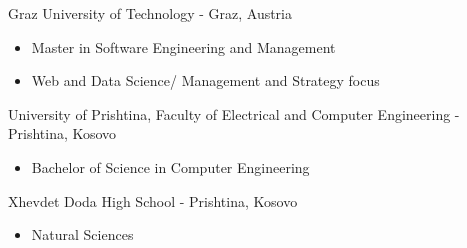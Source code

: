 %
%
%

\begin{scholarship}
  \emptySeparator

					{Graz University of Technology - Graz, Austria
					\begin{itemize}
                        \item Master in Software Engineering and Management
                        \item Web and Data Science/ Management and Strategy focus        
                      \end{itemize}	}
					{University of Prishtina, Faculty of Electrical and Computer Engineering  -  Prishtina, Kosovo
					\begin{itemize}
                        \item Bachelor of Science in Computer Engineering 
                      \end{itemize}
					}
	
					{Xhevdet Doda High School -  Prishtina, Kosovo
					\begin{itemize}
                        \item Natural Sciences                      
                      \end{itemize} 
                      }
\end{scholarship}



 


